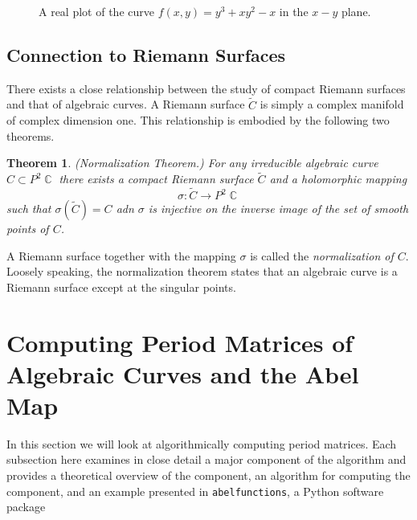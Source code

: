 \documentclass[10pt,twoside]{article}
\theoremstyle{plain}
\newtheorem{theorem}{Theorem}[section]
\theoremstyle{definition}
\numberwithin{equation}{section}
\DeclareMathOperator{\CC}{\mathbb{C}}
\begin{document}
\begin{figure}
  \label{fig: double-pt-example}
  \caption{A real plot of the curve $f(x,y) = y^3 + xy^2 - x$ in the $x-y$ plane.}
\end{figure}

\subsection{Connection to Riemann Surfaces}

There exists a close relationship between the study of compact Riemann
surfaces and that of algebraic curves. A Riemann surface $\tilde{C}$ is
simply a complex manifold of complex dimension one. This relationship is
embodied by the following two theorems.

\begin{theorem} \label{thm: normalization}
  {\it (Normalization Theorem.)} For any irreducible algebraic curve $C
  \subset P^2\CC$ there exists a compact Riemann surface $\tilde{C}$ and
  a holomorphic mapping
  \[
    \sigma : \tilde{C} \to P^2\CC
  \]
  such that $\sigma( \tilde{C} ) = C$ adn $\sigma$ is injective on the
  inverse image of the set of smooth points of $C$.
\end{theorem}

A Riemann surface together with the mapping $\sigma$ is called the {\it
  normalization of $C$}. Loosely speaking, the normalization theorem
states that an algebraic curve is a Riemann surface except at the
singular points.





\section{Computing Period Matrices of Algebraic Curves and the Abel Map}

In this section we will look at algorithmically computing period
matrices. Each subsection here examines in close detail a major
component of the algorithm and provides a theoretical overview of the
component, an algorithm for computing the component, and an example
presented in {\tt abelfunctions}, a Python software package
\end{document}
